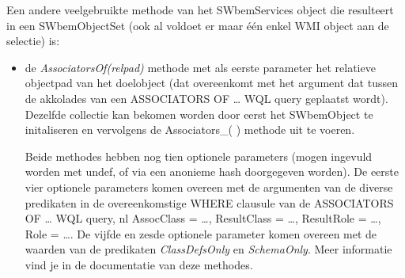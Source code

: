 \documentclass[11pt,a4paper]{report}
\begin{document}
Een andere veelgebruikte methode van het SWbemServices object die resulteert in een SWbemObjectSet (ook al voldoet er maar één enkel WMI object aan de selectie) is:
\begin{itemize}
	\item de\textit{ AssociatorsOf(relpad)} methode met als eerste parameter het relatieve objectpad van het doelobject (dat overeenkomt met het argument dat tussen de akkolades van een ASSOCIATORS OF {…} WQL query geplaatst wordt).
	Dezelfde collectie kan bekomen worden door eerst het SWbemObject te initaliseren en vervolgens de Associators\_( ) methode uit te voeren.
	\par Beide methodes hebben nog tien optionele parameters (mogen ingevuld worden met undef, of via een anonieme hash doorgegeven worden). De eerste vier optionele parameters komen overeen met de argumenten van de diverse predikaten in de overeenkomstige WHERE clausule van de ASSOCIATORS OF {…} WQL query, nl AssocClass = …, ResultClass = …, ResultRole = …, Role = …. De vijfde en zesde optionele parameter komen overeen met de waarden van de predikaten \textit{ClassDefsOnly} en \textit{SchemaOnly}. Meer informatie vind je in de documentatie van deze methodes.
\end{itemize}
\end{document}
